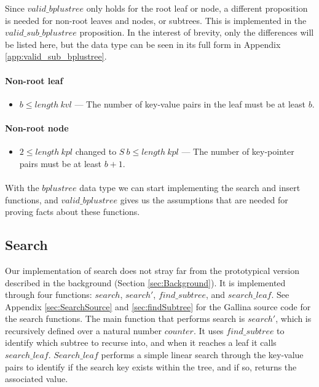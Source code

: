 Since $valid\_bplustree$ only holds for the root leaf or node, a different proposition is needed for non-root leaves and nodes, or subtrees. This is implemented in the $valid\_sub\_bplustree$ proposition. In the interest of brevity, only the differences will be listed here, but the data type can be seen in its full form in Appendix \ref{app:valid_sub_bplustree}.

\paragraph{Non-root leaf}
\begin{itemize}
\item $b \leq length\ kvl$ --- The number of key-value pairs in the leaf must be at least $b$.
\end{itemize}

\paragraph{Non-root node}
\begin{itemize}
\item $2 \leq length\ kpl$ changed to $S\ b \leq length\ kpl$ --- The number of key-pointer pairs must be at least $b+1$.
\end{itemize}

\paragraph{}
With the $bplustree$ data type we can start implementing the search and insert functions, and $valid\_bplustree$ gives us the assumptions that are needed for proving facts about these functions.

\subsection{Search}
\label{subsec:search}
Our implementation of search does not stray far from the prototypical version described in the background (Section \ref{sec:Background}). It is implemented through four functions: $search$, $search'$, $find\_subtree$, and $search\_leaf$. See Appendix \ref{sec:SearchSource} and \ref{sec:findSubtree} for the Gallina source code for the search functions. The main function that performs search is $search'$, which is recursively defined over a natural number $counter$. It uses $find\_subtree$ to identify which subtree to recurse into, and when it reaches a leaf it calls $search\_leaf$. $Search\_leaf$ performs a simple linear search through the key-value pairs to identify if the search key exists within the tree, and if so, returns the associated value. 

